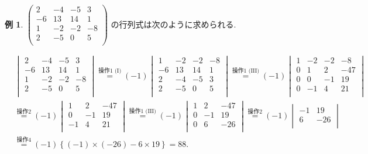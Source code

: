 \documentclass[dvipdfmx,a4paper,11pt]{article} %
\theoremstyle{definition}
\newtheorem{exa}[thm]{例}
\begin{document}
 \begin{exa}
 $
 \begin{pmatrix}
 2&-4&-5&3\\
 -6&13&14&1\\
 1&-2&-2&-8\\
 2&-5&0&5\\
 \end{pmatrix}
$
の行列式は次のように求められる. 

\begin{align*}
 &\begin{vmatrix}
 2&-4&-5&3\\
 -6&13&14&1\\
 1&-2&-2&-8\\
 2&-5&0&5\\
 \end{vmatrix}
 \overset{\text{操作1 (I)}} {=}
 (-1)
  \begin{vmatrix}
   1&-2&-2&-8\\
 -6&13&14&1\\
 2&-4&-5&3\\
 2&-5&0&5\\
 \end{vmatrix}
  \overset{\text{操作1 (III)}}  {=}
 (-1)
  \begin{vmatrix}
   1&-2&-2&-8\\
 0&1 &2  &-47\\
 0& 0&-1&19\\
 0&-1&4&21\\
 \end{vmatrix}
\\ %
& \overset{\text{操作2}} {=}
 (-1)
  \begin{vmatrix}
1 &2  &-47\\
 0&-1&19\\
-1&4&21\\
 \end{vmatrix}
  \overset{\text{操作1 (III)}} {=}
   (-1)
  \begin{vmatrix}
1 &2  &-47\\
 0&-1&19\\
 0&6&-26\\
 \end{vmatrix}
 \overset{\text{操作2}} {=}
  (-1)
    \begin{vmatrix}
-1&19\\
6&-26\\
 \end{vmatrix}
 \\ %
 & \overset{\text{操作4} } {=}
 (-1)\left\{(-1)\times (-26) - 6\times 19\right\} = 88.
\end{align*}
 \end{exa}
 
\end{document}
